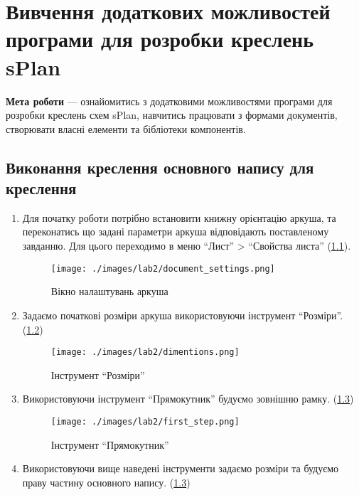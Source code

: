 \chapter[~]{Вивчення додаткових можливостей програми для розробки креслень sPlan}

\textbf{Мета роботи} --- ознайомитись з додатковими можливостями програми для розробки креслень схем
sPlan, навчитись працювати з формами документів, створювати власні елементи та бібліотеки
компонентів.

\section{Виконання креслення основного напису для креслення}

\begin{enumerate}[leftmargin=*]
\item Для початку роботи потрібно встановити книжну орієнтацію аркуша, та переконатись що задані
  параметри аркуша відповідають поставленому завданню. Для цього переходимо в меню ``Лист'' >
  ``Свойства листа'' (\ref{fig:document_settigns}). 

\begin{figure}[!ht]
  \centering
  \texttt{[image: ./images/lab2/document\_settings.png]}
  \caption{Вікно налаштувань аркуша}
  \label{fig:document_settigns} 
\end{figure}

\newpage

\item Задаємо початкові розміри аркуша використовуючи інструмент ``Розміри''. (\ref{fig:dimentions})
  
\begin{figure}[!ht]
  \centering
  \texttt{[image: ./images/lab2/dimentions.png]}
  \caption{Інструмент ``Розміри''}
  \label{fig:dimentions} 
\end{figure}

\item Використовуючи інструмент ``Прямокутник'' будуємо зовнішню рамку. (\ref{fig:rectangle})
  
\begin{figure}[!ht]
  \centering
  \texttt{[image: ./images/lab2/first\_step.png]}
  \caption{Інструмент ``Прямокутник''}
  \label{fig:rectangle} 
\end{figure}

\item Використовуючи вище наведені інструменти задаємо розміри та будуємо праву частину основного
  напису. (\ref{fig:rectangle})
  

\end{enumerate}
